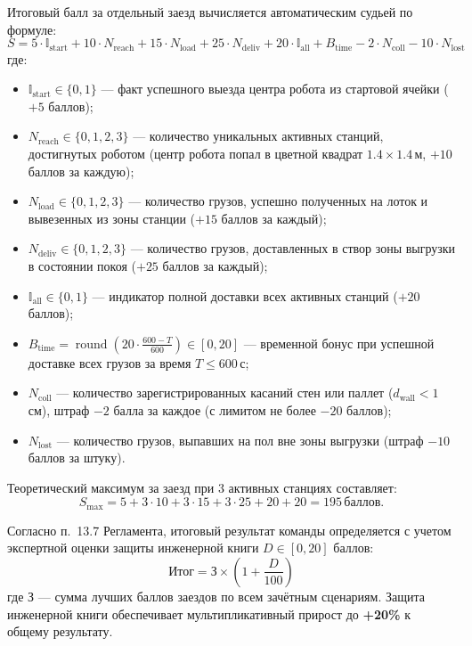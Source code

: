 \documentclass[a4paper,11pt]{article}
\begin{document}
Итоговый балл за отдельный заезд вычисляется автоматическим судьей по формуле:
\begin{equation}
S = 5 \cdot \mathbb{I}_{\text{start}} + 10 \cdot N_{\text{reach}} + 15 \cdot N_{\text{load}} + 25 \cdot N_{\text{deliv}} + 20 \cdot \mathbb{I}_{\text{all}} + B_{\text{time}} - 2 \cdot N_{\text{coll}} - 10 \cdot N_{\text{lost}}
\label{eq:score}
\end{equation}
где:
\begin{itemize}[noitemsep]
    \item $\mathbb{I}_{\text{start}} \in \{0, 1\}$ — факт успешного выезда центра робота из стартовой ячейки ($+5$ баллов);
    \item $N_{\text{reach}} \in \{0, 1, 2, 3\}$ — количество уникальных активных станций, достигнутых роботом (центр робота попал в цветной квадрат $1.4 \times 1.4$\,м, $+10$ баллов за каждую);
    \item $N_{\text{load}} \in \{0, 1, 2, 3\}$ — количество грузов, успешно полученных на лоток и вывезенных из зоны станции ($+15$ баллов за каждый);
    \item $N_{\text{deliv}} \in \{0, 1, 2, 3\}$ — количество грузов, доставленных в створ зоны выгрузки в состоянии покоя ($+25$ баллов за каждый);
    \item $\mathbb{I}_{\text{all}} \in \{0, 1\}$ — индикатор полной доставки всех активных станций ($+20$ баллов);
    \item $B_{\text{time}} = \operatorname{round}\left(20 \cdot \frac{600 - T}{600}\right) \in [0, 20]$ — временной бонус при успешной доставке всех грузов за время $T \le 600$\,с;
    \item $N_{\text{coll}}$ — количество зарегистрированных касаний стен или паллет ($d_{\text{wall}} < 1$\,см), штраф $-2$ балла за каждое (с лимитом не более $-20$ баллов);
    \item $N_{\text{lost}}$ — количество грузов, выпавших на пол вне зоны выгрузки (штраф $-10$ баллов за штуку).
\end{itemize}

Теоретический максимум за заезд при 3 активных станциях составляет:
\begin{equation}
S_{\text{max}} = 5 + 3 \cdot 10 + 3 \cdot 15 + 3 \cdot 25 + 20 + 20 = 195\,\text{баллов}.
\end{equation}

Согласно п.~13.7 Регламента, итоговый результат команды определяется с учетом экспертной оценки защиты инженерной книги $D \in [0, 20]$ баллов:
\begin{equation}
\text{Итог} = \text{З} \times \left(1 + \frac{D}{100}\right)
\end{equation}
где $\text{З}$ — сумма лучших баллов заездов по всем зачётным сценариям. Защита инженерной книги обеспечивает мультипликативный прирост до \textbf{+20\%} к общему результату.
\end{document}
